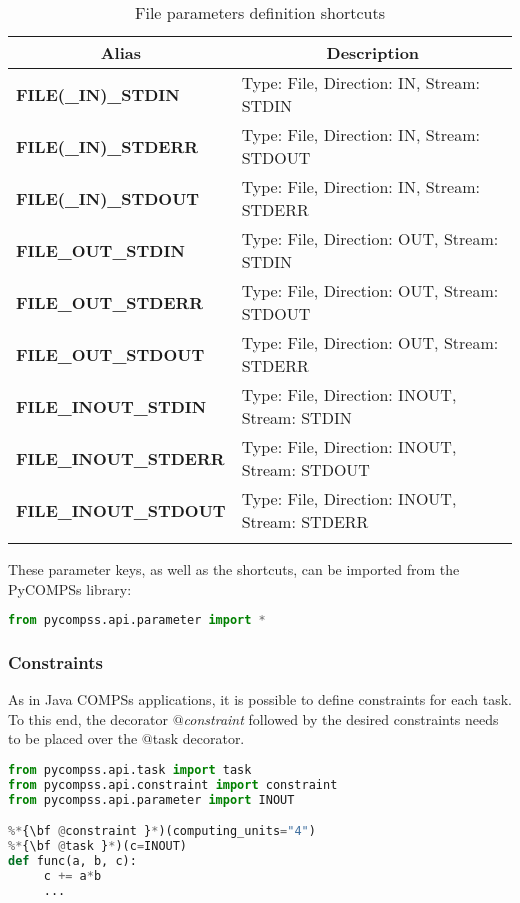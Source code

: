 \bgroup
  \def\arraystretch{1.5}%
  \begin{longtable}{| p{} | p{} |}
    \hline
    \multicolumn{1}{|c|}{{\bf Alias }} &  \multicolumn{1}{c|}{{\bf Description }}\\
    \hline
        \multirow{1}{*}{{\bf FILE(\_IN)\_STDIN}}  & Type: File, Direction: IN, Stream: STDIN \\
        \multirow{1}{*}{{\bf FILE(\_IN)\_STDERR}} & Type: File, Direction: IN, Stream: STDOUT \\
        \multirow{1}{*}{{\bf FILE(\_IN)\_STDOUT}} & Type: File, Direction: IN, Stream: STDERR \\
        \multirow{1}{*}{{\bf FILE\_OUT\_STDIN}}  & Type: File, Direction: OUT, Stream: STDIN \\
        \multirow{1}{*}{{\bf FILE\_OUT\_STDERR}} & Type: File, Direction: OUT, Stream: STDOUT \\
        \multirow{1}{*}{{\bf FILE\_OUT\_STDOUT}} & Type: File, Direction: OUT, Stream: STDERR \\
        \multirow{1}{*}{{\bf FILE\_INOUT\_STDIN}}  & Type: File, Direction: INOUT, Stream: STDIN \\
        \multirow{1}{*}{{\bf FILE\_INOUT\_STDERR}} & Type: File, Direction: INOUT, Stream: STDOUT \\
        \multirow{1}{*}{{\bf FILE\_INOUT\_STDOUT}} & Type: File, Direction: INOUT, Stream: STDERR \\
    \hline
     \caption{File parameters definition shortcuts}
    \label{tab:other_parameters_shortcuts}
  \end{longtable}
\egroup

These parameter keys, as well as the shortcuts, can be imported from the PyCOMPSs library:

\begin{lstlisting}[language=python]
from pycompss.api.parameter import *
\end{lstlisting}

\subsubsection{Constraints}
\label{subsubsec:constraints}

As in Java COMPSs applications, it is possible to define constraints for each task.
To this end, the decorator {\it $@$constraint} followed by the desired constraints needs to be placed over the $@$task decorator.

\begin{lstlisting}[language=python]
from pycompss.api.task import task
from pycompss.api.constraint import constraint
from pycompss.api.parameter import INOUT

%*{\bf @constraint }*)(computing_units="4")
%*{\bf @task }*)(c=INOUT)
def func(a, b, c):
     c += a*b
     ...
\end{lstlisting}

